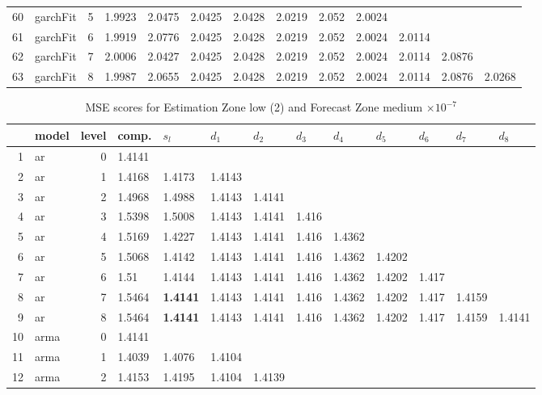 \documentclass[10pt,a4paper]{article}
\begin{document}
\begin{table}[ht]
\begin{tabular}{rlrllllllllll}
  60 & garchFit &     5 & 1.9923 & 2.0475 & 2.0425 & 2.0428 & 2.0219 & 2.052 & 2.0024 &  &  &  \\ 
  61 & garchFit &     6 & 1.9919 & 2.0776 & 2.0425 & 2.0428 & 2.0219 & 2.052 & 2.0024 & 2.0114 &  &  \\ 
  62 & garchFit &     7 & 2.0006 & 2.0427 & 2.0425 & 2.0428 & 2.0219 & 2.052 & 2.0024 & 2.0114 & 2.0876 &  \\ 
  63 & garchFit &     8 & 1.9987 & 2.0655 & 2.0425 & 2.0428 & 2.0219 & 2.052 & 2.0024 & 2.0114 & 2.0876 & 2.0268 \\ 
   \hline
\end{tabular}
\end{table}
\begin{table}[ht]
\centering
\caption{MSE scores for Estimation Zone low (2) and Forecast Zone medium $ \times 10^{-7}$} 
\begin{tabular}{rlrllllllllll}
  \hline
 & model & level & comp. & $s_l$ & $d_1$ & $d_2$ & $d_3$ & $d_4$ & $d_5$ & $d_6$ & $d_7$ & $d_8$ \\ 
  \hline
1 & ar &     0 & 1.4141 &  &  &  &  &  &  &  &  &  \\ 
  2 & ar &     1 & 1.4168 & 1.4173 & 1.4143 &  &  &  &  &  &  &  \\ 
  3 & ar &     2 & 1.4968 & 1.4988 & 1.4143 & 1.4141 &  &  &  &  &  &  \\ 
  4 & ar &     3 & 1.5398 & 1.5008 & 1.4143 & 1.4141 & 1.416 &  &  &  &  &  \\ 
  5 & ar &     4 & 1.5169 & 1.4227 & 1.4143 & 1.4141 & 1.416 & 1.4362 &  &  &  &  \\ 
  6 & ar &     5 & 1.5068 & 1.4142 & 1.4143 & 1.4141 & 1.416 & 1.4362 & 1.4202 &  &  &  \\ 
  7 & ar &     6 & 1.51 & 1.4144 & 1.4143 & 1.4141 & 1.416 & 1.4362 & 1.4202 & 1.417 &  &  \\ 
  8 & ar &     7 & 1.5464 & \textbf{1.4141} & 1.4143 & 1.4141 & 1.416 & 1.4362 & 1.4202 & 1.417 & 1.4159 &  \\ 
  9 & ar &     8 & 1.5464 & \textbf{1.4141} & 1.4143 & 1.4141 & 1.416 & 1.4362 & 1.4202 & 1.417 & 1.4159 & 1.4141 \\ 
   \hline
10 & arma &     0 & 1.4141 &  &  &  &  &  &  &  &  &  \\ 
  11 & arma &     1 & 1.4039 & 1.4076 & 1.4104 &  &  &  &  &  &  &  \\ 
  12 & arma &     2 & 1.4153 & 1.4195 & 1.4104 & 1.4139 &  &  &  &  &  &  \\ 

\end{tabular}
\end{table}
\end{document}
